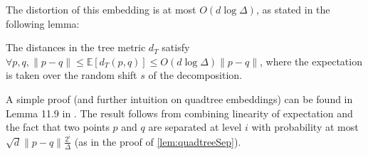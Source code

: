 The distortion of this embedding is at most $O(d \log \Delta)$, as stated in the following lemma:
\begin{lemma}\label{lem:quadtreeDist}
The distances in the tree metric $d_T$ satisfy
$\forall p,q, \|p-q\| \leq \mathbb{E}[d_T(p, q)] \leq O(d \log \Delta) \|p-q\|$, where the expectation is taken over the random shift $s$ of the decomposition.
\end{lemma}

A simple proof (and further intuition on quadtree embeddings) can be found in Lemma 11.9 in \cite{har2011geometric}. The result follows from combining linearity
of expectation and the fact that two points $p$ and $q$ are separated at level $i$ with probability at most $\sqrt{d} \|p-q\| \frac{2^i}{\Delta}$ (as in the
proof of \cref{lem:quadtreeSep}).
